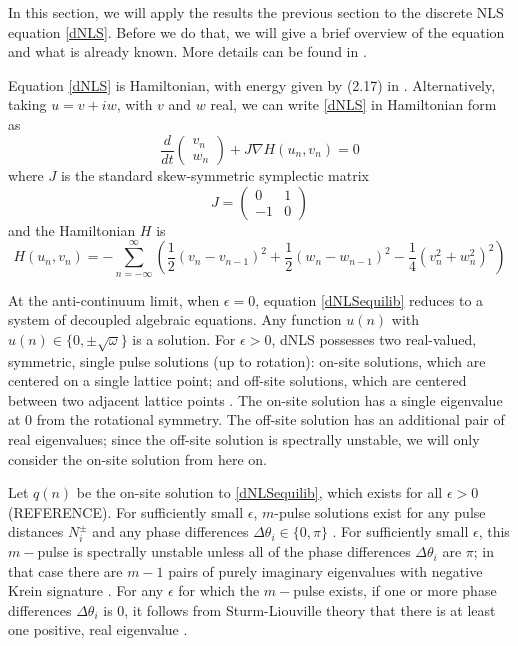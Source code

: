\documentclass[12pt]{article}
\begin{document}
In this section, we will apply the results the previous section to the discrete NLS equation \eqref{dNLS}. Before we do that, we will give a brief overview of the equation and what is already known. More details can be found in \cite{Kevrekidis2009}. 

Equation \eqref{dNLS} is Hamiltonian, with energy given by (2.17) in \cite{Kevrekidis2009}. Alternatively, taking $u = v + i w$, with $v$ and $w$ real, we can write \eqref{dNLS} in Hamiltonian form as
\begin{equation}\label{dNLSrealHam}
\frac{d}{dt}\begin{pmatrix}v_n \\ w_n\end{pmatrix}
+ J \nabla H(u_n, v_n) = 0
\end{equation}
where $J$ is the standard skew-symmetric symplectic matrix
\[
J = \begin{pmatrix}0 & 1 \\ -1 & 0\end{pmatrix}
\]
and the Hamiltonian $H$ is
\begin{equation}\label{dNLSrealH}
H(u_n, v_n) = -\sum_{n = -\infty}^\infty 
\left( \frac{1}{2}\left(v_n - v_{n-1}\right)^2 + \frac{1}{2}\left(w_n - w_{n-1}\right)^2 - \frac{1}{4}\left( v_n^2 + w_n^2 \right)^2 \right)
\end{equation}

At the anti-continuum limit, when $\epsilon = 0$, equation \eqref{dNLSequilib} reduces to a system of decoupled algebraic equations. Any function $u(n)$ with $u(n) \in \{ 0, \pm \sqrt{\omega}\}$ is a solution. For $\epsilon > 0$, dNLS possesses two real-valued, symmetric, single pulse solutions (up to rotation): on-site solutions, which are centered on a single lattice point; and off-site solutions, which are centered between two adjacent lattice points \cite{Kevrekidis2009}. The on-site solution has a single eigenvalue at 0 from the rotational symmetry. The off-site solution has an additional pair of real eigenvalues; since the off-site solution is spectrally unstable, we will only consider the on-site solution from here on. 

Let $q(n)$ be the on-site solution to \eqref{dNLSequilib}, which exists for all $\epsilon > 0$ (REFERENCE). For sufficiently small $\epsilon$, $m$-pulse solutions exist for any pulse distances $N_i^\pm$ and any phase differences $\Delta \theta_i \in \{0, \pi\}$ \cite[Proposition 2.1]{Pelinovsky2005}. For sufficiently small $\epsilon$, this $m-$pulse is spectrally unstable unless all of the phase differences $\Delta \theta_i$ are $\pi$; in that case there are $m-1$ pairs of purely imaginary eigenvalues with negative Krein signature \cite[Theorem 3.6]{Pelinovsky2005}. For any $\epsilon$ for which the $m-$pulse exists, if one or more phase differences $\Delta \theta_i$ is 0, it follows from Sturm-Liouville theory that there is at least one positive, real eigenvalue \cite{Kapitula2001a}.
\end{document}
